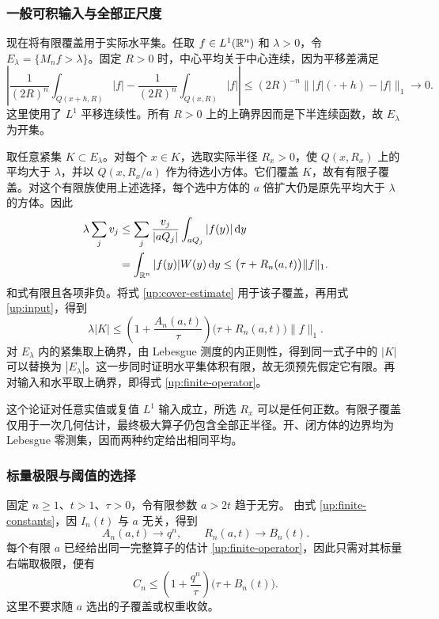 \subsubsection{一般可积输入与全部正尺度}

现在将有限覆盖用于实际水平集。任取 $f\in L^1(\mathbb{R}^n)$ 和 $\lambda>0$，令
$E_\lambda=\{M_nf>\lambda\}$。固定 $R>0$ 时，中心平均关于中心连续，因为平移差满足
\[
 \left|\frac1{(2R)^n}\int_{Q(x+h,R)}|f|
       -\frac1{(2R)^n}\int_{Q(x,R)}|f|\right|
 \le(2R)^{-n}\bigl\||f|(\cdot+h)-|f|\bigr\|_1
 \longrightarrow0.
\]
这里使用了 $L^1$ 平移连续性。所有 $R>0$ 上的上确界因而是下半连续函数，故 $E_\lambda$ 为开集。

取任意紧集 $K\subset E_\lambda$。对每个 $x\in K$，选取实际半径 $R_x>0$，使 $Q(x,R_x)$ 上的平均大于 $\lambda$，并以
$Q(x,R_x/a)$ 作为待选小方体。它们覆盖 $K$，故有有限子覆盖。对这个有限族使用上述选择，每个选中方体的 $a$ 倍扩大仍是原先平均大于 $\lambda$ 的方体。因此
\begin{equation}\label{up:input}
\begin{split}
 \lambda\sum_jv_j
 &\le\sum_j\frac{v_j}{|aQ_j|}\int_{aQ_j}|f(y)|\,\mathrm d y\\
 &=\int_{\mathbb{R}^n}|f(y)|W(y)\,\mathrm d y
 \le\bigl(\tau+R_n(a,t)\bigr)\|f\|_1.
\end{split}
\end{equation}
和式有限且各项非负。将式 \eqref{up:cover-estimate} 用于该子覆盖，再用式 \eqref{up:input}，得到
\[
 \lambda|K|\le
 \left(1+\frac{A_n(a,t)}\tau\right)
 \bigl(\tau+R_n(a,t)\bigr)\|f\|_1.
\]
对 $E_\lambda$ 内的紧集取上确界，由 Lebesgue 测度的内正则性，得到同一式子中的 $|K|$ 可以替换为 $|E_\lambda|$。这一步同时证明水平集体积有限，故无须预先假定它有限。再对输入和水平取上确界，即得式 \eqref{up:finite-operator}。

这个论证对任意实值或复值 $L^1$ 输入成立，所选 $R_x$ 可以是任何正数。有限子覆盖仅用于一次几何估计，最终极大算子仍包含全部正半径。开、闭方体的边界均为 Lebesgue 零测集，因而两种约定给出相同平均。

\subsubsection{标量极限与阈值的选择}

固定 $n\ge1$、$t>1$、$\tau>0$，令有限参数 $a>2t$ 趋于无穷。
由式 \eqref{up:finite-constants}，因 $I_n(t)$ 与 $a$ 无关，得到
\[
 A_n(a,t)\longrightarrow q^n,\qquad
 R_n(a,t)\longrightarrow B_n(t).
\]
每个有限 $a$ 已经给出同一完整算子的估计 \eqref{up:finite-operator}，因此只需对其标量右端取极限，便有
\begin{equation}\label{up:scalar-limit}
 C_n\le\left(1+\frac{q^n}\tau\right)\bigl(\tau+B_n(t)\bigr).
\end{equation}
这里不要求随 $a$ 选出的子覆盖或权重收敛。

